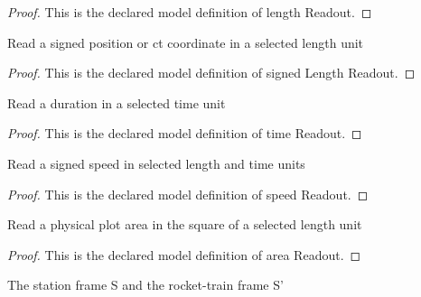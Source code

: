 \begin{proof}
  This is the declared model definition of length Readout.
\end{proof}
\begin{definition}
  \label{def:physics:phyx-mini-0610:phyxminiproblems-problemphyxmini0610-signedlengthreadout}
  Read a signed position or ct coordinate in a selected length unit
\end{definition}
\begin{proof}
  This is the declared model definition of signed Length Readout.
\end{proof}
\begin{definition}
  \label{def:physics:phyx-mini-0610:phyxminiproblems-problemphyxmini0610-timereadout}
  Read a duration in a selected time unit
\end{definition}
\begin{proof}
  This is the declared model definition of time Readout.
\end{proof}
\begin{definition}
  \label{def:physics:phyx-mini-0610:phyxminiproblems-problemphyxmini0610-speedreadout}
  Read a signed speed in selected length and time units
\end{definition}
\begin{proof}
  This is the declared model definition of speed Readout.
\end{proof}
\begin{definition}
  \label{def:physics:phyx-mini-0610:phyxminiproblems-problemphyxmini0610-areareadout}
  Read a physical plot area in the square of a selected length unit
\end{definition}
\begin{proof}
  This is the declared model definition of area Readout.
\end{proof}
\begin{definition}
  \label{def:physics:phyx-mini-0610:phyxminiproblems-problemphyxmini0610-inertialframelabel}
  The station frame S and the rocket-train frame S'
\end{definition}
